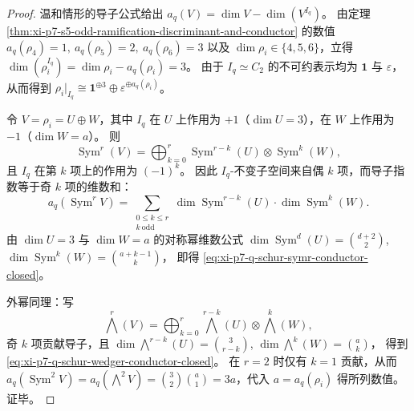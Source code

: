 \begin{proof}
温和情形的导子公式给出 \(a_q(V)=\dim V-\dim(V^{I_q})\)。
由定理 \ref{thm:xi-p7-s5-odd-ramification-discriminant-and-conductor} 的数值
\(
a_q(\rho_4)=1,\ a_q(\rho_5)=2,\ a_q(\rho_6)=3
\)
以及 \(\dim\rho_i\in\{4,5,6\}\)，立得
\(
\dim(\rho_i^{I_q})=\dim\rho_i-a_q(\rho_i)=3
\)。
由于 \(I_q\simeq C_2\) 的不可约表示均为 \(\mathbf 1\) 与 \(\varepsilon\)，从而得到
\(
\rho_i|_{I_q}\cong \mathbf 1^{\oplus 3}\oplus \varepsilon^{\oplus a_q(\rho_i)}
\)。
\par
令 \(V=\rho_i=U\oplus W\)，其中 \(I_q\) 在 \(U\) 上作用为 \(+1\)（\(\dim U=3\)），在 \(W\) 上作用为 \(-1\)（\(\dim W=a\)）。
则
\[
\operatorname{Sym}^{r}(V)=\bigoplus_{k=0}^{r}\operatorname{Sym}^{r-k}(U)\otimes \operatorname{Sym}^{k}(W),
\]
且 \(I_q\) 在第 \(k\) 项上的作用为 \((-1)^k\)。
因此 \(I_q\)-不变子空间来自偶 \(k\) 项，而导子指数等于奇 \(k\) 项的维数和：
\[
a_q(\operatorname{Sym}^r V)=\sum_{\substack{0\le k\le r\\ k\ \mathrm{odd}}}
\dim\operatorname{Sym}^{r-k}(U)\cdot \dim\operatorname{Sym}^{k}(W).
\]
由 \(\dim U=3\) 与 \(\dim W=a\) 的对称幂维数公式
\(
\dim\operatorname{Sym}^{d}(U)=\binom{d+2}{2}
\),
\(
\dim\operatorname{Sym}^{k}(W)=\binom{a+k-1}{k}
\)，
即得 \eqref{eq:xi-p7-q-schur-symr-conductor-closed}。
\par
外幂同理：写
\[
\bigwedge^{r}(V)=\bigoplus_{k=0}^{r}\bigwedge^{r-k}(U)\otimes \bigwedge^{k}(W),
\]
奇 \(k\) 项贡献导子，且
\(
\dim\bigwedge^{r-k}(U)=\binom{3}{r-k}
\),
\(
\dim\bigwedge^{k}(W)=\binom{a}{k}
\)，
得到 \eqref{eq:xi-p7-q-schur-wedger-conductor-closed}。
在 \(r=2\) 时仅有 \(k=1\) 贡献，从而
\(
a_q(\operatorname{Sym}^{2}V)=a_q(\bigwedge^{2}V)=\binom{3}{2}\binom{a}{1}=3a
\)，代入 \(a=a_q(\rho_i)\) 得所列数值。证毕。
\end{proof}


